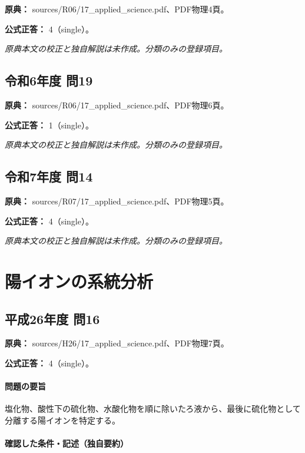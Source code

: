 \noindent\textbf{原典：} sources/R06/17\_applied\_science.pdf、PDF物理4頁。

\textbf{公式正答：} 4（single）。

\par\textit{原典本文の校正と独自解説は未作成。分類のみの登録項目。}

\subsection{令和6年度 問19}
\label{q:r06-reg-applied-19}

\noindent\textbf{原典：} sources/R06/17\_applied\_science.pdf、PDF物理6頁。

\textbf{公式正答：} 1（single）。

\par\textit{原典本文の校正と独自解説は未作成。分類のみの登録項目。}

\subsection{令和7年度 問14}
\label{q:r07-reg-applied-14}

\noindent\textbf{原典：} sources/R07/17\_applied\_science.pdf、PDF物理5頁。

\textbf{公式正答：} 4（single）。

\par\textit{原典本文の校正と独自解説は未作成。分類のみの登録項目。}

\section{陽イオンの系統分析}

\subsection{平成26年度 問16}
\label{q:h26-reg-applied-16}

\noindent\textbf{原典：} sources/H26/17\_applied\_science.pdf、PDF物理7頁。

\textbf{公式正答：} 4（single）。

\paragraph{問題の要旨} 塩化物、酸性下の硫化物、水酸化物を順に除いたろ液から、最後に硫化物として分離する陽イオンを特定する。

\paragraph{確認した条件・記述（独自要約）}\mbox{}\par

